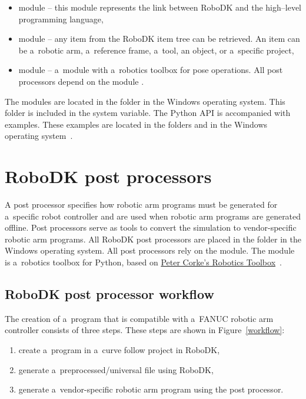 \begin{itemize}
    \item {} module -- this module represents the link between RoboDK and the high--level programming language,
    \item {} module -- any item from the RoboDK item tree can be retrieved.  An item can be a~robotic arm, a~reference frame, a~tool, an object, or a~specific project,
    \item {} module -- a~module with a~robotics toolbox for pose operations. All post processors depend on the  module .
\end{itemize}

The modules are located in the folder   in the Windows operating system. This folder is included in the  system variable. The Python API is accompanied with examples. These examples are located in the folders \newline {} and    in the Windows operating system~\cite{robodkapipython}.

\section{RoboDK post processors}

A post processor specifies how robotic arm programs must be generated for a~specific robot controller and are used when robotic arm programs are generated offline. Post processors serve as tools to convert the simulation to vendor-specific robotic arm programs. All RoboDK post processors are placed in the  folder in the Windows operating system. All post processors rely on the  module. The  module is a~robotics toolbox for Python, based on \href{http://petercorke.com/Robotics_Toolbox.html}{Peter Corke’s Robotics Toolbox}~\cite{robodkapipython}. 

\subsection{RoboDK post processor workflow}

The creation of a~program that is compatible with a~FANUC robotic arm controller consists of three steps. These steps are shown in Figure~\ref{workflow}:

\begin{enumerate}
  \item create a~program in a~curve follow project in RoboDK,   
  \item generate a~preprocessed/universal  file using RoboDK,
  \item generate a~vendor-specific robotic arm  program using the post processor.
\end{enumerate}


